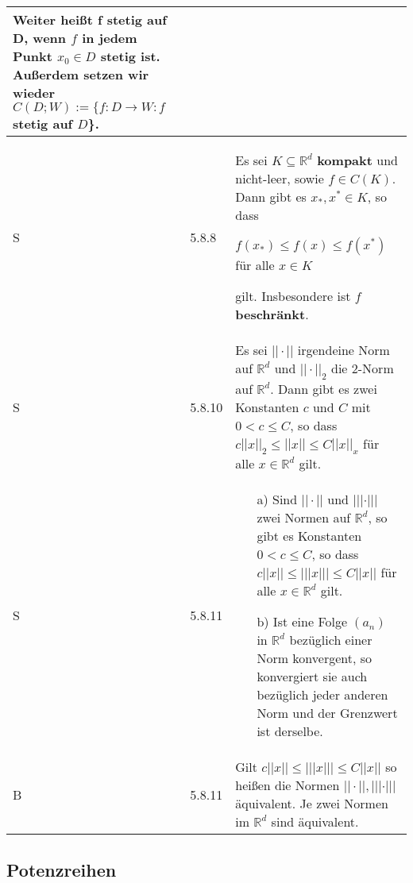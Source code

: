 \begin{longtable}{p{0.75cm} p{1cm} p{16cm}}
                Weiter heißt \textbf{f stetig auf D}, wenn $f$ in jedem Punkt $x_0 \in D$ stetig ist. \hfill \break
                Au\ss erdem setzen wir wieder $C(D;W) := \{f: D\rightarrow W: f$ stetig auf $D$\}. \\
        \midrule
        S   & 5.8.8 &   Es sei $K \subseteq \mathbb{R}^d$ \textbf{kompakt} und nicht-leer, sowie $f \in C(K)$. Dann gibt es $x_*, x^* \in K$, so dass \hfill \break
                        \centerline{$f(x_*) \leq f(x) \leq f(x^*)$ für alle $x \in K$}
                        gilt. Insbesondere ist $f$ \textbf{beschränkt}. \\
        \midrule
        S   & 5.8.10&   Es sei $||\cdot||$ irgendeine Norm auf $\mathbb{R}^d$ und $||\cdot||_2$ die 2-Norm auf $\mathbb{R}^d$. Dann gibt es zwei Konstanten
                        $c$ und $C$ mit $0 < c \leq C$, so dass $c||x||_2  \leq ||x|| \leq C ||x||_x$ für alle $x \in \mathbb{R}^d$ gilt. \\
        \midrule
        S   & 5.8.11&   \begin{itemize}[topsep=-0.5cm]
                            \item[a)] Sind $||\cdot||$ und $|||\cdot|||$ zwei Normen auf $\mathbb{R}^d$, so gibt es Konstanten $0 < c \leq C$, so dass
                                        $c||x|| \leq |||x||| \leq C||x||$ für alle $x \in \mathbb{R}^d$ gilt.
                            \item[b)] Ist eine Folge $(a_n)$ in $\mathbb{R}^d$ bezüglich einer Norm konvergent, so konvergiert sie auch bezüglich  
                                        jeder anderen Norm und der Grenzwert ist derselbe. 
                        \end{itemize} \vspace{-0cm} \\
        \midrule
        B   & 5.8.11&   Gilt $c||x|| \leq |||x||| \leq C||x||$ so hei\ss en die Normen $||\cdot||,|||\cdot|||$ äquivalent. \hfill \break
                        Je zwei Normen im $\mathbb{R}^d$ sind äquivalent. \\
        \bottomrule

    \end{longtable}

\subsection{Potenzreihen}

